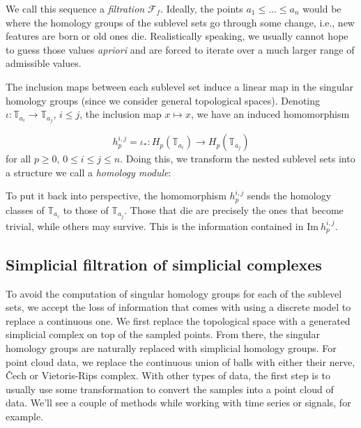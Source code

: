   We call this sequence a \textit{filtration} $\mathcal{F}_{f}$. Ideally, the points $a_{1} \leq \ldots \leq a_{n}$ would be where the homology groups of the sublevel sets go through some change, i.e., new features are born or old ones die. Realistically speaking, we usually cannot hope to guess those values \textit{apriori} and are forced to iterate over a much larger range of admissible values.

  The inclusion maps between each sublevel set induce a linear map in the singular homology groups (since we consider general topological spaces). Denoting $\iota: \mathbb{T}_{a_{i}} \to \mathbb{T}_{a_{j}}$, $i \leq j$, the inclusion map $x \mapsto x$, we have an induced homomorphism

  \begin{equation*}
    h_{p}^{i,j} = \iota_{*}: H_{p}(\mathbb{T}_{a_{i}}) \to H_{p}(\mathbb{T}_{a_{j}})
  \end{equation*}
  for all $p \geq 0$, $0 \leq i \leq j \leq n$. Doing this, we transform the nested sublevel sets into a structure we call a \textit{homology module}:

  \begin{figure}[h]
    \centering
  \end{figure}

  To put it back into perspective, the homomorphism $h_{p}^{i,j}$ sends the homology classes of $\mathbb{T}_{a_{i}}$ to those of $\mathbb{T}_{a_{j}}$. Those that die are precisely the ones that become trivial, while others may survive. This is the information contained in $\text{Im}\:h_{p}^{i,j}$.

  \subsection{Simplicial filtration of simplicial complexes}
  To avoid the computation of singular homology groups for each of the sublevel sets, we accept the loss of information that comes with using a discrete model to replace a continuous one. We first replace the topological space with a generated simplicial complex on top of the sampled points. From there, the singular homology groups are naturally replaced with simplicial homology groups. For point cloud data, we replace the continuous union of balls with either their nerve, Čech or Vietoris-Rips complex. With other types of data, the first step is to usually use some transformation to convert the samples into a point cloud of data. We'll see a couple of methods while working with time series or signals, for example.

